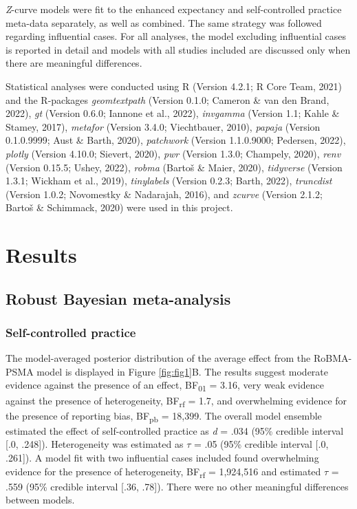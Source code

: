\documentclass[
  doc, donotrepeattitle,floatsintext]{apa7}
\begin{document}
\emph{Z}-curve models were fit to the enhanced expectancy and self-controlled practice meta-data separately, as well as combined. The same strategy was followed regarding influential cases. For all analyses, the model excluding influential cases is reported in detail and models with all studies included are discussed only when there are meaningful differences.

Statistical analyses were conducted using R (Version 4.2.1; R Core Team, 2021) and the R-packages \emph{geomtextpath} (Version 0.1.0; Cameron \& van den Brand, 2022), \emph{gt} (Version 0.6.0; Iannone et al., 2022), \emph{invgamma} (Version 1.1; Kahle \& Stamey, 2017), \emph{metafor} (Version 3.4.0; Viechtbauer, 2010), \emph{papaja} (Version 0.1.0.9999; Aust \& Barth, 2020), \emph{patchwork} (Version 1.1.0.9000; Pedersen, 2022), \emph{plotly} (Version 4.10.0; Sievert, 2020), \emph{pwr} (Version 1.3.0; Champely, 2020), \emph{renv} (Version 0.15.5; Ushey, 2022), \emph{robma} (Bartoš \& Maier, 2020), \emph{tidyverse} (Version 1.3.1; Wickham et al., 2019), \emph{tinylabels} (Version 0.2.3; Barth, 2022), \emph{truncdist} (Version 1.0.2; Novomestky \& Nadarajah, 2016), and \emph{zcurve} (Version 2.1.2; Bartoš \& Schimmack, 2020) were used in this project.

\hypertarget{results}{%
\section{Results}\label{results}}

\hypertarget{robust-bayesian-meta-analysis-1}{%
\subsection{Robust Bayesian meta-analysis}\label{robust-bayesian-meta-analysis-1}}

\hypertarget{self-controlled-practice}{%
\subsubsection{Self-controlled practice}\label{self-controlled-practice}}

The model-averaged posterior distribution of the average effect from the RoBMA-PSMA model is displayed in Figure \ref{fig:fig1}B. The results suggest moderate evidence against the presence of an effect, BF\textsubscript{01} = 3.16, very weak evidence against the presence of heterogeneity, BF\textsubscript{rf} = 1.7, and overwhelming evidence for the presence of reporting bias, BF\textsubscript{pb} = 18,399. The overall model ensemble estimated the effect of self-controlled practice as \emph{d} = .034 (95\% credible interval {[}.0, .248{]}). Heterogeneity was estimated as \(\tau\) = .05 (95\% credible interval {[}.0, .261{]}). A model fit with two influential cases included found overwhelming evidence for the presence of heterogeneity, BF\textsubscript{rf} = 1,924,516 and estimated \(\tau\) = .559 (95\% credible interval {[}.36, .78{]}). There were no other meaningful differences between models.
\end{document}
